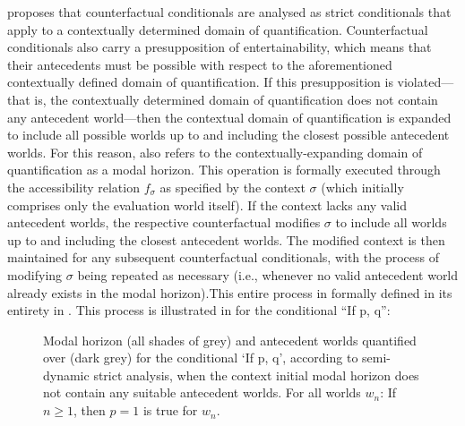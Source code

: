 \textcite{Fintel2001} proposes that counterfactual conditionals are analysed as strict conditionals that apply to a contextually determined domain of quantification. Counterfactual conditionals also carry a presupposition of entertainability, which means that their antecedents must be possible with respect to the aforementioned contextually defined domain of quantification. If this presupposition is violated---that is, the contextually determined domain of quantification does not contain any antecedent world---then the contextual domain of quantification is expanded to include all possible worlds up to and including the closest possible antecedent worlds. For this reason, \textcite{Fintel2001} also refers to the contextually-expanding domain of quantification as a modal horizon. This operation is formally executed through the accessibility relation $f_\sigma$ as specified by the context $\sigma$ (which initially comprises only the evaluation world itself). If the context lacks any valid antecedent worlds, the respective counterfactual modifies $\sigma$ to include all worlds up to and including the closest antecedent worlds. The modified context is then maintained for any subsequent counterfactual conditionals, with the process of modifying $\sigma$ being repeated as necessary (i.e., whenever no valid antecedent world already exists in the modal horizon).\linebreak\newpage\noindent This entire process in formally defined in its entirety in .
\pex{}
\xe
This process is illustrated in  for the conditional \enquote{If p, q}:
\begin{figure}[!htb]
\resizebox{\textwidth}{!}{}
\caption{Modal horizon (all shades of grey) and antecedent worlds quantified over (dark grey) for the conditional `If p, q', according to  semi-dynamic strict analysis, when the context initial modal horizon does not contain any suitable antecedent worlds. For all worlds $w_n$: If $n\geqslant1$, then $p=1$ is true for $w_n$.}
\end{figure}

